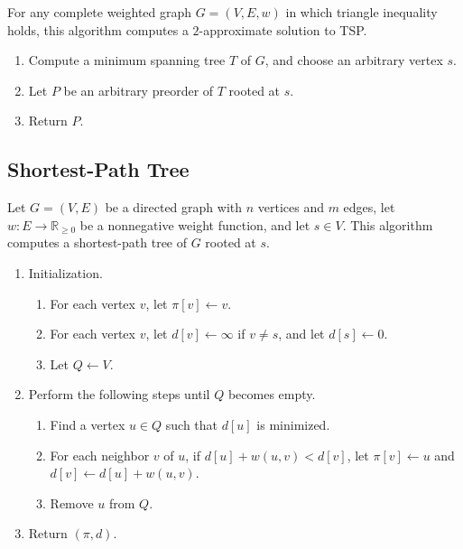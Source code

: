 \documentclass[11pt]{article}
\newcommand{\RR}{\mathbb{R}}
\begin{document}
\begin{algorithm}
  For any complete weighted graph $G = (V, E, w)$ in which triangle inequality holds, this algorithm computes a $2$-approximate solution to TSP.
  \begin{enumerate}[label=\arabic*.]
    \item Compute a minimum spanning tree $T$ of $G$, and choose an arbitrary vertex $s$.
    \item Let $P$ be an arbitrary preorder of $T$ rooted at $s$.
    \item Return $P$.
  \end{enumerate}
\end{algorithm}

\subsection{Shortest-Path Tree}
\begin{algorithm}[Dijkstra]
  Let $G = (V, E)$ be a directed graph with $n$ vertices and $m$ edges, let $w: E \to \RR_{\geq 0}$ be a nonnegative weight function, and let $s \in V$.
  This algorithm computes a shortest-path tree of $G$ rooted at $s$.
  \begin{enumerate}[label=\arabic*.]
    \item Initialization.
    \begin{enumerate}[label*=\arabic*.]
      \item For each vertex $v$, let $\pi[v] \gets v$.
      \item For each vertex $v$, let $d[v] \gets \infty$ if $v \neq s$, and let $d[s] \gets 0$.
      \item Let $Q \gets V$.
    \end{enumerate}
    \item Perform the following steps until $Q$ becomes empty.
    \begin{enumerate}[label*=\arabic*.]
      \item Find a vertex $u \in Q$ such that $d[u]$ is minimized.
      \item For each neighbor $v$ of $u$, if $d[u] + w(u, v) < d[v]$, let $\pi[v] \gets u$ and $d[v] \gets d[u] + w(u, v)$.
      \item Remove $u$ from $Q$.
    \end{enumerate}
    \item Return $(\pi, d)$.
  \end{enumerate}
\end{algorithm}
\end{document}
